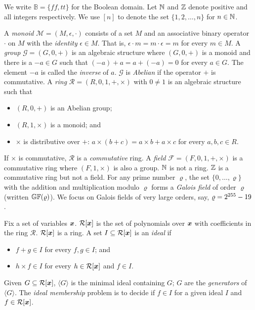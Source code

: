 
We write $\mathbb{B} = \{ \mathit{ff}, \mathit{tt} \}$ for the Boolean
domain. Let $\mathbb{N}$ and $\mathbb{Z}$ denote positive and all integers
respectively. We use $[n]$ to denote the set $\{ 1, 2, \ldots, n \}$
for $n \in \mathbb{N}$. 

A \emph{monoid} $\mathcal{M} = (M, \epsilon, \cdot)$ consists of a set
$M$ and an associative binary operator $\cdot$ on $M$ with the
\emph{identity} $\epsilon \in M$. That is, $\epsilon \cdot m = m \cdot
\epsilon = m$ for every $m \in M$.
A \emph{group} $\mathcal{G} = (G, 0, +)$ is an algebraic structure
where $(G, 0, +)$ is a monoid and there is a $-a \in G$ such that
$(-a) + a = a + (-a) = 0$ for every $a \in G$. The element $-a$ is
called the \emph{inverse} of $a$. $\mathcal{G}$ is \emph{Abelian} if
the operator $+$ is commutative.
A \emph{ring} $\mathcal{R} = (R, 0, 1, +, \times)$ with $0 \neq 1$ is
an algebraic structure such that
\begin{itemize}
\item $(R, 0, +)$ is an Abelian group; 
\item $(R, 1, \times)$ is a monoid; and 
\item $\times$ is distributive over $+$: $a \times (b + c) = a \times
  b + a \times c$ for every $a, b, c \in R$.
\end{itemize}
If $\times$ is commutative, $\mathcal{R}$ is a \emph{commutative}
ring. 
A \emph{field} $\mathcal{F} = (F,
0, 1, +, \times)$ is a commutative ring where $(F, 1, \times)$ is also
a group. $\mathbb{N}$ is not a ring. $\mathbb{Z}$ is a commutative ring but not
a field. 
For any prime number $\varrho$, the set $\{ 0, \ldots, \varrho \}$
with the addition and multiplication modulo $\varrho$ forms a \emph{Galois
field} of order $\varrho$ (written $\mathbb{GF}(\varrho)$).
We focus on Galois fields of very large orders, say, $\varrho =
2^{255} - 19$.

Fix a set of variables $\vx$. $\mathcal{R}[\vx]$ is the set of
polynomials over $\vx$ with coefficients in the ring
$\mathcal{R}$. $\mathcal{R}[\vx]$ is a ring. A set $I \subseteq
\mathcal{R}[\vx]$ is an \emph{ideal} if 
\begin{itemize}
\item $f + g \in I$ for every $f, g \in I$; and
\item $h \times f \in I$ for every $h \in
  \mathcal{R}[\vx]$ and $f \in I$. 
\end{itemize}
Given $G \subseteq \mathcal{R}[\vx]$, $\langle G \rangle$ is the
minimal ideal containing $G$; $G$ are the \emph{generators}
of $\langle G \rangle$. The \emph{ideal membership}
problem is to decide if $f \in I$ for a given ideal $I$ and $f
\in \mathcal{R}[\vx]$.